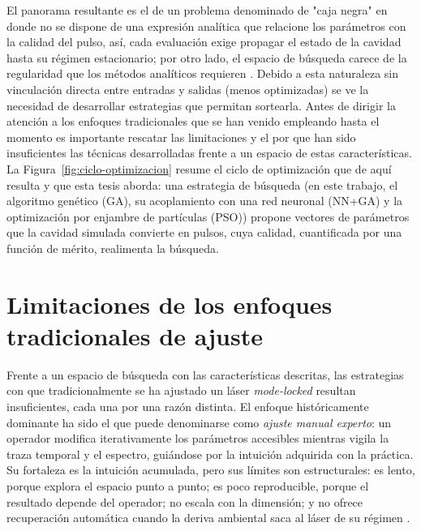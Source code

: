 El panorama resultante es el de un problema denominado de "caja negra" en donde no se dispone de una expresión analítica que relacione los parámetros con la calidad del pulso, así, cada evaluación exige propagar el estado de la cavidad hasta su régimen estacionario; por otro lado, el espacio de búsqueda carece de la regularidad que los métodos analíticos requieren \cite{Genty2021,Woodward2016}. Debido a esta naturaleza sin vinculación directa entre entradas y salidas (menos optimizadas) se ve la necesidad de desarrollar estrategias que permitan sortearla. Antes de dirigir la atención a los enfoques tradicionales que se han venido empleando hasta el momento es importante rescatar las limitaciones y el por que han sido insuficientes las técnicas desarrolladas frente a un espacio de estas características. La Figura~\ref{fig:ciclo-optimizacion} resume el ciclo de optimización que de aquí resulta y que esta tesis aborda: una estrategia de búsqueda (en este trabajo, el algoritmo genético (GA), su acoplamiento con una red neuronal (NN+GA) y la optimización por enjambre de partículas (PSO)) propone vectores de parámetros que la cavidad simulada convierte en pulsos, cuya calidad, cuantificada por una función de mérito, realimenta la búsqueda.




\section{Limitaciones de los enfoques tradicionales de ajuste}
\label{sec:enfoques-tradicionales-intro}
 
Frente a un espacio de búsqueda con las características descritas, las estrategias con que tradicionalmente se ha ajustado un láser \emph{mode-locked} resultan insuficientes, cada una por una razón distinta. El enfoque históricamente dominante ha sido el que puede denominarse como \emph{ajuste manual experto}: un operador modifica iterativamente los parámetros accesibles mientras vigila la traza temporal y el espectro, guiándose por la intuición adquirida con la práctica. Su fortaleza es la intuición acumulada, pero sus límites son estructurales: es lento, porque explora el espacio punto a punto; es poco reproducible, porque el resultado depende del operador; no escala con la dimensión; y no ofrece recuperación automática cuando la deriva ambiental saca al láser de su régimen \cite{Pu2019,Pu2020}.
 
